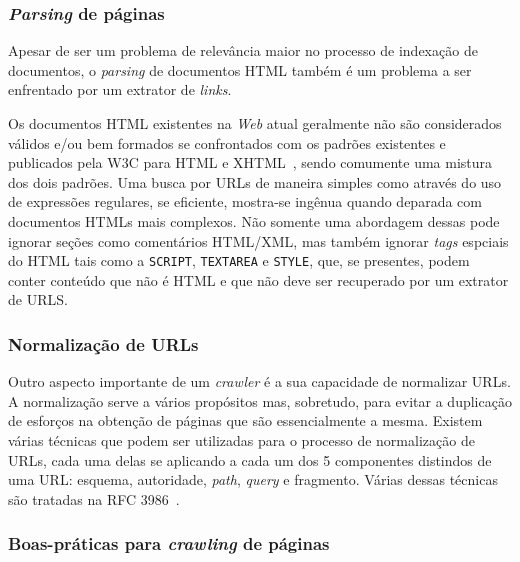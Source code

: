 \documentclass[10pt,twocolumn]{article}
\begin{document}
\subsubsection{\emph{Parsing} de páginas}\label{prob:html}

Apesar de ser um problema de relevância maior no processo de indexação
de documentos, o \emph{parsing} de documentos HTML também é um problema
a ser enfrentado por um extrator de \emph{links}.

Os documentos HTML existentes na \emph{Web} atual geralmente não são
considerados válidos
e/ou bem formados se confrontados com os padrões existentes e publicados
pela W3C para HTML e XHTML~\cite{html4tr, bray2006xml}, sendo comumente
uma mistura dos dois padrões. Uma busca por URLs de maneira simples como
através do uso de expressões regulares, se eficiente, mostra-se ingênua
quando deparada com documentos HTMLs mais complexos. Não somente uma
abordagem dessas pode ignorar seções como comentários HTML/XML, mas
também ignorar \emph{tags} espciais do HTML tais como a \texttt{SCRIPT},
\texttt{TEXTAREA} e \texttt{STYLE}, que, se presentes, podem conter
conteúdo que não é HTML e que não deve ser recuperado por um extrator de
URLS.

\subsubsection{Normalização de URLs}\label{prob:urlnorm}

Outro aspecto importante de um \emph{crawler} é a sua capacidade de
normalizar URLs. A normalização serve a vários propósitos mas, sobretudo, para
evitar a duplicação de esforços na obtenção de páginas que são
essencialmente a mesma. Existem várias técnicas que podem ser utilizadas
para o processo de normalização de URLs, cada uma delas se aplicando a
cada um dos 5 componentes distindos de uma URL: esquema, autoridade,
\emph{path}, \emph{query} e fragmento. Várias dessas técnicas são
tratadas na RFC 3986~\cite{rfc3986}.


\subsubsection{Boas-práticas para \emph{crawling} de
páginas}\label{prob:robots}
\end{document}
